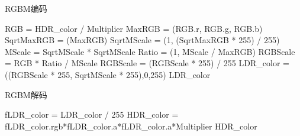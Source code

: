 \begin{algorithm}
    \caption{RGBM编码}
    \label{algo:RGBMEncode}
    {
        \Tfloat RGB = HDR\_color / Multiplier\;
        \float MaxRGB = \max(RGB.r, RGB.g, RGB.b)\;
        \float SqrtMaxRGB = \sqrt(MaxRGB)\;
        \float SqrtMScale = \min(1, \ceil(SqrtMaxRGB * 255) / 255)\;
        \float MScale = SqrtMScale * SqrtMScale\;
        \float Ratio = \min(1, MScale / MaxRGB)\;
        \Tfloat RGBScale = RGB * Ratio / MScale\;
        RGBScale = \round(RGBScale * 255) / 255\;
        \FInt LDR\_color = \clamp(\FInt(RGBScale * 255, SqrtMScale * 255),0,255)\;
        \Return LDR\_color\;
    }
\end{algorithm}
\begin{algorithm}
    \caption{RGBM解码}
    \label{algo:RGBMDecode}
    {
        \Ffloat fLDR\_color = LDR\_color / 255\;
        \Tfloat HDR\_color = fLDR\_color.rgb*fLDR\_color.a*fLDR\_color.a*Multiplier\;
        \Return HDR\_color\;
    }
\end{algorithm}

    
